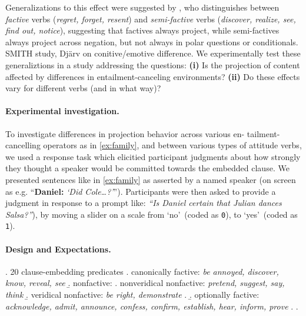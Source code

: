 \documentclass[12pt, a4paper]{scrartcl}
\begin{document}
	Generalizations to this effect were suggested by \citet{karttunen_observations_1971}, who distinguishes between \emph{factive} verbs (\emph{regret, forget, resent}) and \emph{semi-factive} verbs (\emph{discover, realize, see, find out, notice}), suggesting that factives always project, while semi-factives always project across negation, but not always in polar questions or conditionals. SMITH study, Djärv on conitive/emotive difference.
	We experimentally test these generaliztions in a study addressing the questions: \textbf{(i)} Is the projection of content affected by differences in entailment-canceling environments? \textbf{(ii)} Do these effects vary for different verbs (and in what way)?

\vspace{-\baselineskip}
\paragraph{Experimental investigation.} %

	To investigate differences in projection behavior across various en- tailment-cancelling operators as in \ref{ex:family}, and between various types of attitude verbs, we used a response task which elicitied participant judgments about how strongly they thought a speaker would be committed towards the embedded clause. We presented sentences like in \ref{ex:family} as asserted by a named speaker (on screen as e.g. “\textbf{Daniel:} \emph{\lq Did Cole\dots?\rq}”). Participants were then asked to provide a judgment in response to a prompt like: \emph{“Is Daniel certain that Julian dances Salsa?”}), by moving a slider on a scale from \lq no\rq\ (coded as \texttt{0}), to \lq yes\rq\ (coded as \texttt{1}). 


\paragraph{Design and Expectations.} %
	\ex. 20 clause-embedding predicates 
		\a. canonically factive: {\em be annoyed, discover, know, reveal, see}
		\b. nonfactive:
			\a. nonveridical nonfactive: {\em pretend, suggest, say, think}
			\b. veridical nonfactive: {\em be right, demonstrate}
			\z.
		\b. optionally factive: {\em acknowledge, admit, announce, confess, confirm, establish, hear, inform, prove}
		\z.
	\z.
\end{document}
